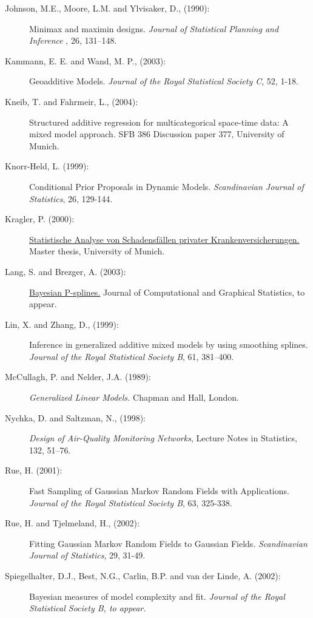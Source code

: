 \begin{description}
\item[Johnson, M.E., Moore, L.M. and
Ylvisaker, D., (1990):] Minimax and maximin designs. {\it Journal of Statistical Planning and Inference}
, 26, 131--148.

\item[Kammann, E. E. and Wand, M. P., (2003):] Geoadditive Models. {\it Journal of the Royal
Statistical Society C}, 52, 1-18.

\item[Kneib, T. and Fahrmeir, L., (2004):] Structured additive regression for multicategorical space-time data: A mixed model approach.
SFB 386 Discussion paper 377, University of Munich.

\item[Knorr-Held, L. (1999):]
Conditional Prior Proposals in Dynamic Models. {\em Scandinavian
Journal of Statistics}, 26, 129-144.

\item[Kragler, P. (2000):] \href{http://www.scor.fr/us/2_laureat.asp?pays=2}
{Statistische Analyse von Schadensf\"allen privater
Krankenversicherungen.} Master thesis, University of Munich.


\item[Lang, S. and Brezger, A. (2003):] \href{http://www.stat.uni-muenchen.de/~lang/publications.html}
{Bayesian P-splines.} Journal of Computational and Graphical
Statistics, to appear.

\item[Lin, X. and Zhang, D., (1999):]
Inference in generalized additive mixed models by using smoothing
splines. {\it Journal of the Royal Statistical Society B}, 61,
381--400.

\item[McCullagh, P. and Nelder, J.A. (1989):] {\em Generalized Linear Models.} Chapman and Hall, London.

\item[Nychka, D. and Saltzman, N., (1998):]
{\it Design of Air-Quality Monitoring Networks},
Lecture Notes in Statistics, 132, 51--76.

\item[Rue, H. (2001):] Fast Sampling of Gaussian Markov Random Fields with Applications.
{\em Journal of the Royal Statistical Society B}, 63, 325-338.

\item[Rue, H. and Tjelmeland, H., (2002):]
Fitting Gaussian Markov Random Fields to Gaussian Fields. {\it
Scandinavian Journal of Statistics}, 29, 31-49.

\item[Spiegelhalter, D.J., Best, N.G., Carlin, B.P. and van der Linde, A. (2002):]
Bayesian measures of model complexity and fit. {\em Journal of the
Royal Statistical Society B, to appear.}

\end{description}
